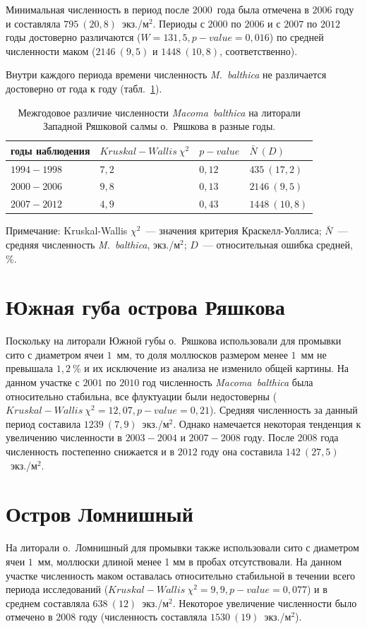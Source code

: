 Минимальная численность в период после $2000$~года была отмечена в $2006$ году и составляла $795~(20,8)$~экз./м$^2$. 
Периоды с $2000$ по $2006$ и с $2007$ по $2012$ годы достоверно различаются ($W = 131,5, p-value = 0,016$) по средней численности маком ($2146~(9,5)$ и $1448~(10,8)$, соответственно).

Внутри каждого периода времени численность {\it M.~balthica} не различается достоверно от года к году (табл.~\ref{tab:ZRS_N2_Kruskal}).

	\begin{table}[p]
	\caption{Межгодовое различие численности {\it Macoma~balthica} на литорали Западной Ряшковой салмы о.~Ряшкова в разные годы.}
	\label{tab:ZRS_N2_Kruskal}
	\begin{tabularx}{\textwidth}{|*{4}{X|}} \hline
	годы наблюдения & $Kruskal-Wallis\ \chi^2$ & $p-value$ & $\bar{N} ~ (D)$ \\ 
	\hline
	$1994 - 1998$ & $7,2$ & $0,12$ & $435~(17,2)$ \\
	\hline
	$2000 - 2006$ & $9,8$ & $0,13$ & $2146~(9,5)$\\
	\hline
	$2007 - 2012$ & $4,9$ & $0,43$ & $1448~(10,8)$ \\
	\hline
	\end{tabularx}
	{\footnotesize Примечание: Kruskal-Wallis $\chi^2$~--- значения критерия Краскелл-Уоллиса; $\bar{N}$~--- средняя численность {\it 	M.~balthica}, экз./м$^2$; $D$~--- относительная ошибка средней, \%.}
	\end{table}


		\section{Южная губа острова Ряшкова}
Поскольку на литорали Южной губы о.~Ряшкова использовали для промывки сито с диаметром ячеи $1$~мм, то доля моллюсков размером менее $1$~мм не превышала $1,2~\%$ и их исключение из анализа не изменило общей картины.
На данном участке с $2001$ по $2010$ год численность {\it Macoma~balthica} была относительно стабильна, все флуктуации были недостоверны ($Kruskal-Wallis\ \chi^2 = 12,07, p-value = 0,21$). 
Средняя численность за данный период составила $1239~(7,9)$~экз./м$^2$.
Однако намечается некоторая тенденция к увеличению численности в $2003-2004$ и $2007-2008$ году.
После $2008$ года численность постепенно снижается и в $2012$ году она составила $142~(27,5)$~экз./м$^2$.

		\section{Остров Ломнишный}
На литорали о.~Ломнишный для промывки также использовали сито с диаметром ячеи $1$~мм, моллюски длиной менее 1 мм в пробах отсутствовали.
На данном участке численность маком оставалась относительно стабильной в течении всего периода исследований ($Kruskal-Wallis\ \chi^2 = 9,9, p-value = 0,077$) и в среднем составляла $638~(12)$~экз./м$^2$.
Некоторое увеличение численности было отмечено в $2008$ году (численность составляла $1530~(19)$~экз./м$^2$).

